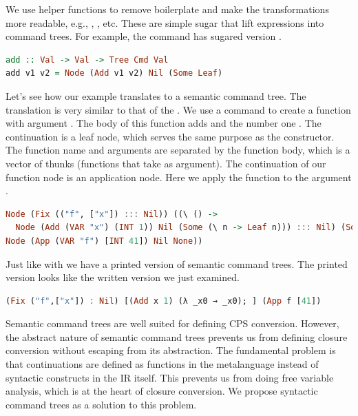 We use helper functions to remove boilerplate and make the transformations more readable, e.g., , , etc. These are simple sugar that lift expressions into command trees. For example, the  command has sugared version .

\begin{lstlisting}[language=Haskell]
add :: Val -> Val -> Tree Cmd Val
add v1 v2 = Node (Add v1 v2) Nil (Some Leaf)
\end{lstlisting}

Let's see how our example  translates to a semantic command tree. The translation is very similar to that of the . We use a  command to create a function  with argument . The body of this function adds  and the number one . The continuation is a leaf node, which serves the same purpose as the  constructor. The function name and arguments are separated by the function body, which is a vector of thunks (functions that take \icode{()} as argument). The continuation of our function node is an application node. Here we apply the function  to the argument .
  
\begin{lstlisting}[language=Haskell]
Node (Fix (("f", ["x"]) ::: Nil)) ((\ () ->
  Node (Add (VAR "x") (INT 1)) Nil (Some (\ n -> Leaf n))) ::: Nil) (Some (\ () ->
Node (App (VAR "f") [INT 41]) Nil None))
\end{lstlisting}

Just like with  we have a printed version of semantic command trees. The printed version looks like the written version we just examined.

\begin{lstlisting}[language=Haskell]
(Fix ("f",["x"]) : Nil) [(Add x 1) (λ _x0 → _x0); ] (App f [41])
\end{lstlisting}

Semantic command trees are well suited for defining CPS conversion. However, the abstract nature of semantic command trees prevents us from defining closure conversion without escaping from its abstraction. The fundamental problem is that continuations are defined as functions in the metalanguage instead of syntactic constructs in the IR itself. This prevents us from doing free variable analysis, which is at the heart of closure conversion. We propose syntactic command trees as a solution to this problem.

